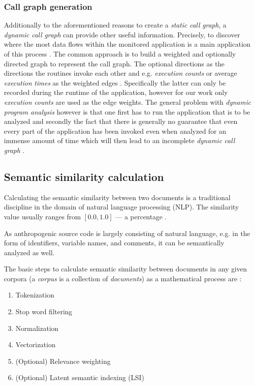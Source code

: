 \documentclass[12pt,a4paper]{report}
\begin{document}
\subsubsection{Call graph generation} \label{subsubsect:call-graph-dynamic}
Additionally to the aforementioned reasons to create a \textit{static call
graph}, a \textit{dynamic call graph} can provide other useful information.
Precisely, to discover where the most data flows within the monitored
application is a main application of this process \cite{graham1982gprof}. The
common approach is to build a weighted and optionally directed graph to
represent the call graph. The optional directions as the directions the
routines invoke each other and e.g. \textit{execution counts} or average
\textit{execution times} as the weighted edges \cite{graham1982gprof}.
Specifically the latter can only be recorded during the runtime of the
application, however for our work only \textit{execution counts} are used as
the edge weights. The general problem with \textit{dynamic program analysis}
however is that one first has to run the application that is to be analyzed and
secondly the fact that there is generally no guarantee that even every part of
the application has been invoked even when analyzed for an immense amount of
time which will then lead to an incomplete \textit{dynamic call graph}
\cite{
graham1982gprof}.


\subsection{Semantic similarity calculation} \label{subsect:semantic-similarity}

Calculating the semantic similarity between two documents is a traditional
discipline in the domain of natural language processing (NLP). The similarity
value usually ranges from \([0.0, 1.0]\) --- a percentage \cite{singhal2001ir}.

As anthropogenic source code is largely consisting of natural language, e.g. in
the form of identifiers, variable names, and comments, it can be semantically
analyzed as well.

The basic steps to calculate semantic similarity between documents in any given
corpora (a \textit{corpus} is a collection of \textit{documents}) as a
mathematical process are \cite{singhal2001ir}:
\begin{enumerate}
  \item Tokenization
  \item Stop word filtering
  \item Normalization
  \item Vectorization
  \item (Optional) Relevance weighting
  \item (Optional) Latent semantic indexing (LSI)
\end{enumerate}
\end{document}
